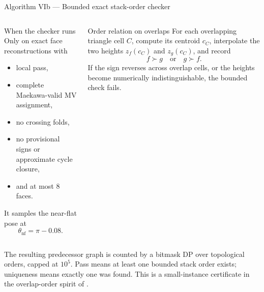 \documentclass[aspectratio=169,10pt]{beamer}
\begin{document}
\begin{frame}{Algorithm VIb — Bounded exact stack-order checker}
\begin{columns}[T,onlytextwidth]
\begin{block}{When the checker runs}
\scriptsize Only on exact face reconstructions with
\begin{itemize}\scriptsize
  \item local pass,
  \item complete Maekawa-valid MV assignment,
  \item no crossing folds,
  \item no provisional signs or approximate cycle closure,
  \item and at most \(8\) faces.
\end{itemize}
It samples the near-flat pose at
\[
\theta_{\mathrm{nf}}=\pi-0.08.
\]
\end{block}

\begin{alertblock}{Order relation on overlaps}
\scriptsize For each overlapping triangle cell \(C\), compute its centroid
\(c_C\), interpolate the two heights \(z_f(c_C)\) and \(z_g(c_C)\), and record
\[
f\succ g\quad\text{or}\quad g\succ f.
\]
If the sign reverses across overlap cells, or the heights become numerically
indistinguishable, the bounded check fails.
\end{alertblock}
\end{columns}

\medskip
\scriptsize The resulting predecessor graph is counted by a bitmask DP over
topological orders, capped at \(10^5\). Pass means at least one bounded stack
order exists; uniqueness means exactly one was found. This is a small-instance
certificate in the overlap-order spirit of \textcolor{cpmid}{\cite{bern_hayes,eppstein_flat}}.
\end{frame}
\end{document}
